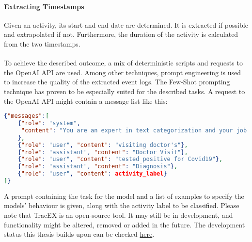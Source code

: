 \paragraph{Extracting Timestamps} Given an activity, its start and end date are determined. It is extracted if possible and extrapolated if not. Furthermore, the duration of the activity is calculated from the two timestamps.\\\\
To achieve the described outcome, a mix of deterministic scripts and requests to the OpenAI API are used. Among other techniques, prompt engineering is used to increase the quality of the extracted event logs.
The Few-Shot prompting technique has proven to be especially suited for the described tasks. A request to the OpenAI API might contain a message list like this:
\begin{lstlisting}[language=json, caption={Few-shot prompt to categorize activities into event types}, label={lst:few-shot}]
{"messages":[
	{"role": "system",  
     "content": "You are an expert in text categorization and your job is to take a given activity label and to classify it into one of the following event types: 'Symptom Onset', 'Symptom Offset', 'Diagnosis', 'Doctor Visit', 'Treatment', 'Hospital Admission', 'Hospital Discharge', 'Medication', 'Lifestyle Change' and 'Feelings'. Please consider the capitalization.",  
	},  
    {"role": "user", "content": "visiting doctor's"},  
    {"role": "assistant", "content": "Doctor Visit"},  
    {"role": "user", "content": "tested positive for Covid19"},
    {"role": "assistant", "content": "Diagnosis"},  
    {"role": "user", "content": activity_label}  
]}
\end{lstlisting}
A prompt containing the task for the model and a list of examples to specify the models' behaviour is given, along with the activity label to be classified.
Please note that TracEX is an open-source tool. It may still be in development, and functionality might be altered, removed or added in the future. The development status this thesis builds upon can be checked 
\href{https://github.com/FR-SON/TracEX}{here}.
